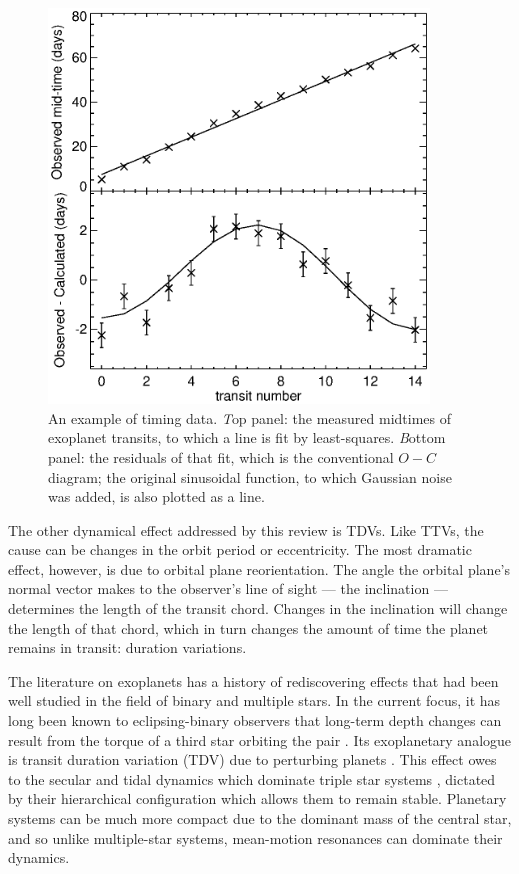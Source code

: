\documentclass[graybox,natbib,nosecnum]{svmult}
\begin{document}
\begin{figure}
\centerline{
\includegraphics[width=0.9\textwidth]{omc.eps}}
%
\caption{An example of timing data.  {\emph Top panel}: the measured midtimes of exoplanet transits, to which a line is fit by least-squares.  {\emph Bottom panel}: the residuals of that fit, which is the conventional $O-C$ diagram; the original sinusoidal function, to which Gaussian noise was added, is also plotted as a line. }
\label{omc}       %
\end{figure}

The other dynamical effect addressed by this review is TDVs.  Like TTVs, the cause can be changes in the orbit period or eccentricity.  The most dramatic effect, however, is due to orbital plane reorientation.  The angle the orbital plane's normal vector makes to the observer's line of sight --- the inclination --- determines the length of the transit chord.  Changes in the inclination will change the length of that chord, which in turn changes the amount of time the planet remains in transit: duration variations. 

The literature on exoplanets has a history of rediscovering effects that had been well studied in the field of binary and multiple stars.  In the current focus, it has long been known to eclipsing-binary observers that long-term depth changes can result from the torque of a third star orbiting the pair \citep{1971Mayer}.  Its exoplanetary analogue is transit duration variation (TDV) due to perturbing planets \citep{2002ApJ...564.1019M}. This effect owes to the secular and tidal dynamics which dominate triple star systems \citep{2003A&A...398.1091B}, dictated by their hierarchical configuration which allows them to remain stable. Planetary systems can be much more compact due to the dominant mass of the central star, and so unlike multiple-star systems, mean-motion resonances can dominate their dynamics.  
\end{document}
